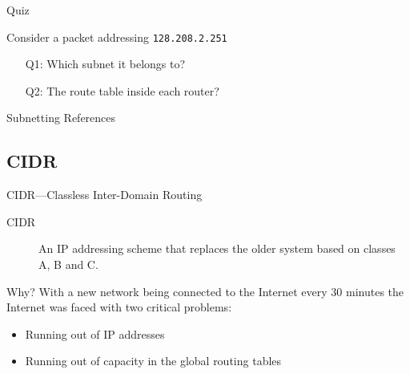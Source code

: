 \begin{frame}{Quiz}
  \begin{center}
  \end{center}
  Consider a packet addressing \texttt{128.208.2.251}
  \begin{itemize}
  \item[Q1:] Which subnet it belongs to?
  \item[Q2:] The route table inside each router?
  \end{itemize}
\end{frame}

\begin{frame}{Subnetting References}
  \begin{refsection}
    \nocite{wiki:subnet, wiki:ipv4subnetref,wiki:privatenet,rfc917,rfc950}
    \printbibliography[heading=none]
  \end{refsection}
\end{frame}

\subsection{CIDR}

\begin{frame}{CIDR---Classless Inter-Domain Routing}
  \begin{description}
  \item[CIDR] An IP addressing scheme that replaces the older system
    based on classes A, B and C.
  \end{description}
  \begin{block}{Why?}
    With a new network being connected to the Internet every 30 minutes the Internet was
    faced with two critical problems:
    \begin{itemize}
    \item Running out of IP addresses
    \item Running out of capacity in the global routing tables
    \end{itemize}
  \end{block}
\end{frame}

